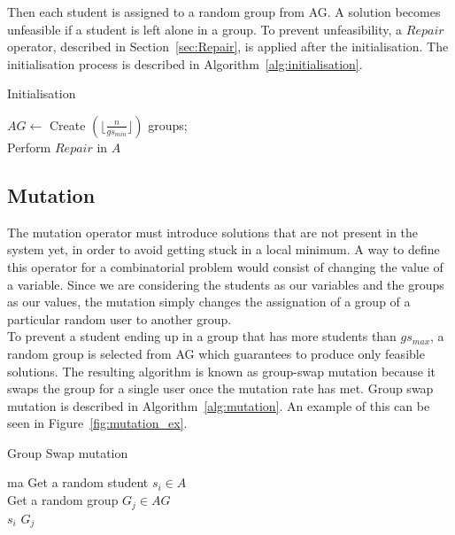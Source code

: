 Then each student is assigned to a random group from AG.
A solution becomes unfeasible if a student is left alone in a group.
To prevent unfeasibility, %
a $Repair$ operator, described in Section~\ref{sec:Repair}, is applied after the initialisation. The initialisation process is described in Algorithm~\ref{alg:initialisation}.\\

\begin{algorithm}[H]
\caption{Initialisation}
\label{alg:initialisation}
\SetAlgoLined 
$AG \leftarrow$ Create $(\lfloor\frac{n}{gs_{min}}\rfloor)$ groups;\\
Perform $Repair$ in $A$
\end{algorithm}

\subsection{Mutation}
\label{section:mutation_operator}

The mutation operator %
must introduce solutions that are not present in the system yet, in order to avoid getting stuck in a local minimum. A way to define this operator for a combinatorial problem would consist of changing the value of a variable. Since we are considering the students as our variables and the groups as our values, the mutation simply changes the assignation of a group of a particular random user to another group.\\

To prevent a student ending up in a group that has more students than $gs_{max}$, a random group is selected from AG which guarantees to produce only feasible solutions. The resulting algorithm is known as group-swap mutation because it swaps the group for a single user once the mutation rate has met. Group swap mutation is described in Algorithm~\ref{alg:mutation}. An example of this can be seen in Figure~\ref{fig:mutation_ex}.

\begin{algorithm}[H]
    \caption{Group Swap mutation}
    \label{alg:mutation}
    \SetAlgoLined ma
    Get a random student $s_i \in A$\;\\
    Get a random group $G_j \in AG$\;\\
    $s_i$ \gets $G_j$ 
\end{algorithm}

